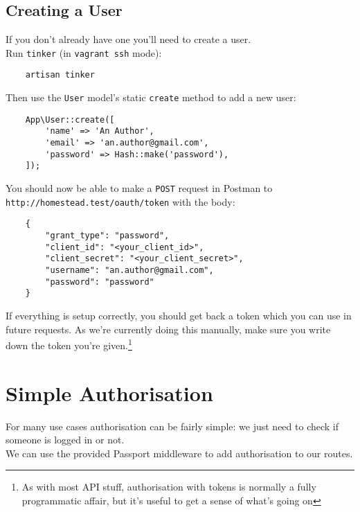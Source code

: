 \subsection{Creating a User}

If you don't already have one you'll need to create a user.
\\

Run \texttt{tinker} (in \texttt{vagrant ssh} mode):

\begin{verbatim}
    artisan tinker
\end{verbatim}

Then use the \texttt{User} model's static \texttt{create} method to add a new user:

\begin{verbatim}
    App\User::create([
        'name' => 'An Author',
        'email' => 'an.author@gmail.com',
        'password' => Hash::make('password'),
    ]);
\end{verbatim}

You should now be able to make a \texttt{POST} request in Postman to \\ \texttt{http://homestead.test/oauth/token} with the body:

\begin{verbatim}
    {
        "grant_type": "password",
        "client_id": "<your_client_id>",
        "client_secret": "<your_client_secret>",
        "username": "an.author@gmail.com",
        "password": "password"
    }
\end{verbatim}

If everything is setup correctly, you should get back a token which you can use in future requests. As we're currently doing this manually, make sure you write down the token you're given.\footnote{As with most API stuff, authorisation with tokens is normally a fully programmatic affair, but it's useful to get a sense of what's going on}


\pagebreak


\section{Simple Authorisation}

For many use cases authorisation can be fairly simple: we just need to check if someone is logged in or not.
\\

We can use the provided Passport middleware to add authorisation to our routes.


